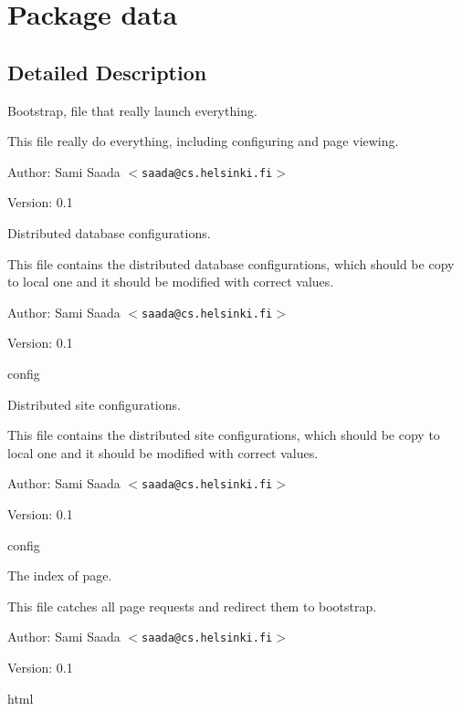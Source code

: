 \section{Package data}
\label{namespacedata}




\subsection{Detailed Description}
Bootstrap, file that really launch everything.

This file really do everything, including configuring and page viewing. \begin{Desc}
\item[Author:]Sami Saada $<${\tt saada@cs.helsinki.fi}$>$ \end{Desc}
\begin{Desc}
\item[Version:]0.1\end{Desc}
Distributed database configurations.

This file contains the distributed database configurations, which should be copy to local one and it should be modified with correct values. \begin{Desc}
\item[Author:]Sami Saada $<${\tt saada@cs.helsinki.fi}$>$ \end{Desc}
\begin{Desc}
\item[Version:]0.1\end{Desc}
config

Distributed site configurations.

This file contains the distributed site configurations, which should be copy to local one and it should be modified with correct values. \begin{Desc}
\item[Author:]Sami Saada $<${\tt saada@cs.helsinki.fi}$>$ \end{Desc}
\begin{Desc}
\item[Version:]0.1\end{Desc}
config

The index of page.

This file catches all page requests and redirect them to bootstrap. \begin{Desc}
\item[Author:]Sami Saada $<${\tt saada@cs.helsinki.fi}$>$ \end{Desc}
\begin{Desc}
\item[Version:]0.1\end{Desc}
html 